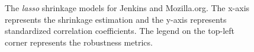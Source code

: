 \begin{figure}[ht!] 
\centering     %
{}
  \captionsetup{justification=justified,
singlelinecheck=false}
\caption{The \textit{lasso} shrinkage models for Jenkins and Mozilla.org. The x-axis represents the shrinkage estimation and the y-axis represents standardized correlation coefficients. The legend on the top-left corner represents the robustness metrics. }
\label{fig:lasso3}
\end{figure} 

